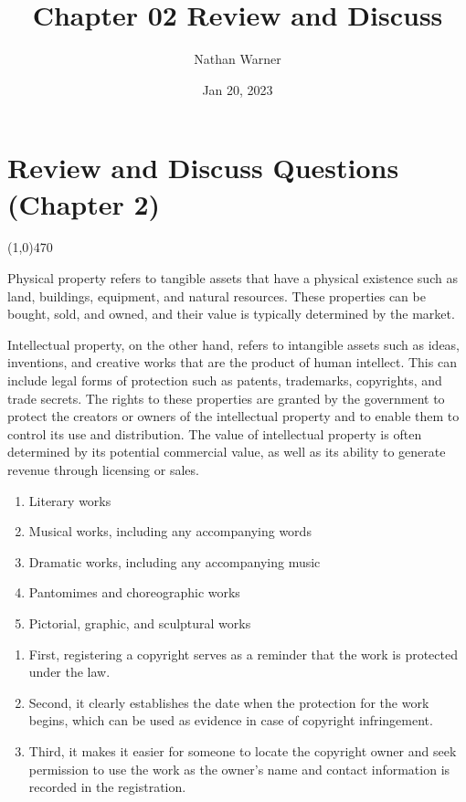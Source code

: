 \documentclass{report}
\title{\Huge{Chapter 02 Review and Discuss}}
\author{\huge{Nathan Warner}}
\date{\huge{Jan 20, 2023}}
\begin{document}
    \maketitle
    \section{\Large{Review and Discuss Questions (Chapter 2)}}
    \line(1,0){470}
    \bigbreak \noindent 

    Physical property refers to tangible assets that have a physical existence such as 
    land, buildings, equipment, and natural resources. These properties can be bought, 
    sold, and owned, and their value is typically determined by the market.

    Intellectual property, on the other hand, refers to intangible assets such as ideas, 
    inventions, and creative works that are the product of human intellect. This can include 
    legal forms of protection such as patents, trademarks, copyrights, and trade secrets. The 
    rights to these properties are granted by the government to protect the creators or owners 
    of the intellectual property and to enable them to control its use and distribution. The 
    value of intellectual property is often determined by its potential commercial value, 
    as well as its ability to generate revenue through licensing or sales.
    \bigbreak \noindent 

    \begin{enumerate}
        \item Literary works
        \item Musical works, including any accompanying words
        \item Dramatic works, including any accompanying music
        \item Pantomimes and choreographic works
        \item Pictorial, graphic, and sculptural works
    \end{enumerate}
    
    \bigbreak \noindent 

    \begin{enumerate}
        \item First, registering a copyright serves as a reminder that the work is protected under the law.
        \item Second, it clearly establishes the date when the protection for the work begins, which can be used as evidence in case of copyright infringement.
        \item Third, it makes it easier for someone to locate the copyright owner and seek permission to use the work as the owner's name and contact information is recorded in the registration. 
    \end{enumerate}
    
\end{document}

